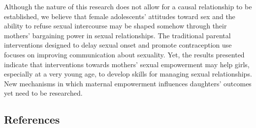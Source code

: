 \documentclass[
]{article}
\begin{document}
Although the nature of this research does not allow for a causal
relationship to be established, we believe that female adolescents'
attitudes toward sex and the ability to refuse sexual intercourse may be
shaped somehow through their mothers' bargaining power in sexual
relationships. The traditional parental interventions designed to delay
sexual onset and promote contraception use focuses on improving
communication about sexuality. Yet, the results presented indicate that
interventions towards mothers' sexual empowerment may help girls,
especially at a very young age, to develop skills for managing sexual
relationships. New mechanisms in which maternal empowerment influences
daughters' outcomes yet need to be researched.

\hypertarget{references}{%
\subsection*{References}\label{references}}
\end{document}
